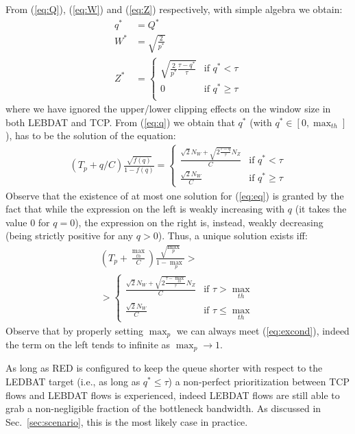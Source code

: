 \documentclass[conference]{IEEEtran}
\newcommand{\secR}[1]{Sec.~\ref{sec:#1}}
\begin{document}
From (\ref{eq:Q}), (\ref{eq:W}) and (\ref{eq:Z}) respectively, with simple algebra we obtain:
\begin{align}
q^*&=Q^*\\
W^*&=\sqrt{\frac{2}{p^*}}\\
Z^*&=\left\{ \begin{array}{ll}
\sqrt{\frac{2}{p^*}\frac{\tau -  q^*}{\tau }}  & \mbox{if } q^*<\tau\\
   0             & \mbox{if } q^*\ge \tau \\
\end{array}\right.
\end{align}
\noindent where we have ignored the upper/lower clipping effects on the window size in both LEBDAT and TCP.
From (\ref{eq:q}) we obtain that $q^*$ (with $q^* \in [0, \max_{th}]$), has to be the solution of the equation:
\begin{multline}
\left(T_p + q/C\right)\frac{\sqrt{f(q)}}{ 1- {f(q)}}= 
\left\{ \begin{array}{ll}
\frac{ \sqrt{2}N_W+\sqrt{2\frac{\tau- q}{\tau}}N_{Z}}{C}                 & \text{if } q^* < \tau \\
\frac{ \sqrt{2} N_{W}}{C}      &\text{if }  q^*\ge\tau        
\end{array} \right.  \label{eq:eq}  
\end{multline}
Observe that the existence of at most one solution for (\ref{eq:eq}) is granted by the fact that while the expression on the left is weakly increasing with $q$ (it takes the value 0 for $q=0$),  the expression on the right is, instead, weakly decreasing (being strictly positive for any $q>0$). Thus, a unique solution exists iff:
\begin{multline}
\left(T_p +\frac{\max_{th}}{C}\right)\frac{\sqrt{\max_p}}{ 1- \max_p}>\\>
 \left\{  \begin{array}{ll}\frac{\sqrt{2}N_W+\sqrt{2 \frac{\tau-\max_{th} }{\tau}}N_{Z}}{C}  & \text{if }  \tau >\max_{th}\\  
 \frac{\sqrt{2} N_{W}}{C} &  \text{if } \tau\le\max_{th}
\end{array}  \right. \label{eq:excond}
\end{multline}
Observe that by properly setting ${\max_p}$ we can always meet (\ref{eq:excond}), indeed the term on the left tends to infinite as ${\max_p} \to 1$.

As long as RED is configured to keep the queue shorter with respect to the LEDBAT target (i.e., as long as $q^*\le \tau$) a non-perfect prioritization between TCP flows and LEBDAT flows is experienced, indeed LEBDAT flows are still able to grab a non-negligible fraction of the bottleneck bandwidth.  As discussed in \secR{scenario}, this is the most likely case in practice.
\end{document}
